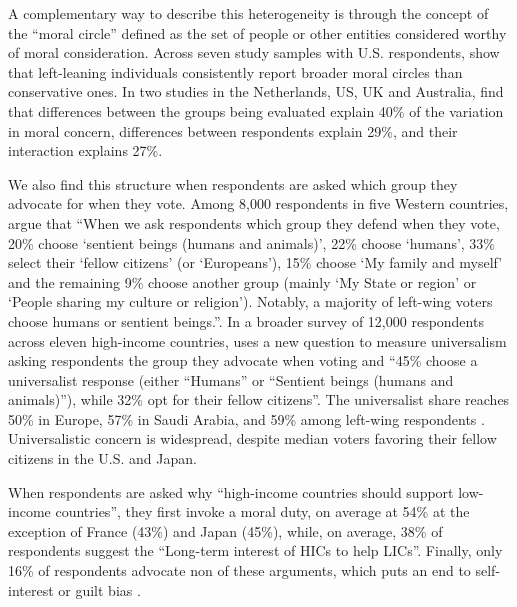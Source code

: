 
A complementary way to describe this heterogeneity is through the concept of the ``moral circle'' defined as the set of people or other entities considered worthy of moral consideration. Across seven study samples with U.S. respondents, \citet{waytz_ideological_2019} show that left-leaning individuals consistently report broader moral circles than conservative ones. %
In two studies in the Netherlands, US, UK and Australia, \citet{jaeger_relative_2023} find that differences between the groups being evaluated explain 40\% of the variation in moral concern, differences between respondents explain 29\%, and their interaction explains 27\%. %

We also find this structure when respondents are asked which group they advocate for when they vote. Among 8,000 respondents in five Western countries, \citet{fabre_majority_2025} argue that ``When we ask respondents which group they defend when they vote, 20\% choose ‘sentient beings (humans and animals)’, 22\% choose ‘humans’, 33\% select their ‘fellow citizens’ (or ‘Europeans’), 15\% choose ‘My family and myself’ and the remaining 9\% choose another group (mainly ‘My State or region’ or ‘People sharing my culture or religion’). Notably, a majority of left-wing voters choose humans or sentient beings.''. In a broader survey of 12,000 respondents across eleven 
high-income 
countries, \citet{fabre_public_2026} uses a new question to measure universalism asking respondents the group they advocate when voting and ``45\% choose a universalist  response (either “Humans” or “Sentient beings (humans and animals)”), while 32\% opt for their fellow citizens''. The universalist share reaches 50\% in Europe, 57\% in Saudi Arabia, and 59\% among left-wing respondents \citep{fabre_public_2026}. Universalistic concern is widespread, despite median voters favoring their fellow citizens in the U.S. and Japan.



When respondents are asked why ``high-income countries should support low-income countries'', they first invoke a moral duty, on average at 54\% at the exception of France (43\%) and Japan (45\%), while, on average, 38\% of respondents suggest the ``Long-term interest of HICs to help LICs''. Finally, only 16\% of respondents advocate non of these arguments, which puts an end to self-interest or guilt bias \citep{fabre_public_2026}.

